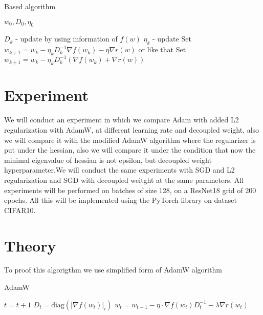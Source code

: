 \documentclass{article}
\begin{document}
\begin{algorithm}[H]
	\caption{Based algorithm}\label{alg:Based}
	$w_0, D_0, \eta_0$
	\begin{algorithmic}
		\State $D_k$ - update by using information of $f(w)$
		\State $\eta_k$ - update
		\State Set $w_{k+1} = w_k - \eta_k D_k^{-1} \nabla f(w_k) - \eta \nabla r(w)$ 
		\State or like that
		\State Set $w_{k+1} = w_k - \eta_k D_k^{-1} (\nabla f(w_k) + \nabla r(w))$
		\EndFor
	\end{algorithmic}
\end{algorithm}





\section{Experiment}

We will conduct an experiment in which we compare Adam with added L2 regularization with AdamW, at different learning rate and decoupled weight, also we will compare it with the modified AdamW algorithm where the regularizer is put under the hessian, also we will compare it under the condition that now the minimal eigenvalue of hessian is not epsilon, but decoupled weight hyperparameter.We will conduct the same experiments with SGD and L2 regularization and SGD with decoupled weitght at the same parameters. All experiments will be performed on batches of size 128, on a ResNet18 grid of 200 epochs. All this will be implemented using the PyTorch library on dataset CIFAR10.

\section{Theory}
To proof this algorigthm we use simplified form of AdamW algorithm
\begin{algorithm}[H]
\caption{AdamW}\label{alg:AdamW}
    
    \begin{algorithmic}
        \State $t = t+1$
        \State $D_t = \text{diag}(|\nabla f(w_t)|_i)$
        \State $w_t = w_{t-1} - \eta \cdot \nabla f(w_t) D_t^{-1}  -\lambda \nabla r(w_t)$ 
    \EndWhile
\end{algorithmic}
\end{algorithm}
\end{document}
